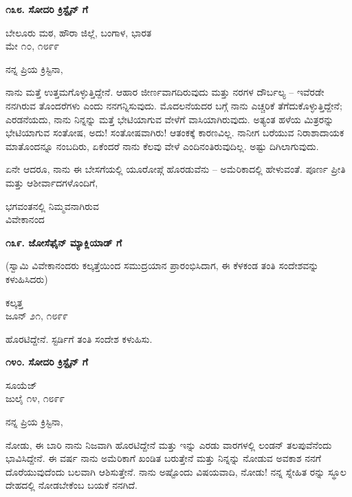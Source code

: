 \begin{center}
\textbf{೧೩೮. ಸೋದರಿ ಕ್ರಿಸ್ಟೈನ್ ಗೆ}
\end{center}

\begin{flushright}
ಬೇಲೂರು ಮಠ, ಹೌರಾ ಜಿಲ್ಲೆ, ಬಂಗಾಳ, ಭಾರತ\\ಮೇ ೧೦, ೧೮೯೯
\end{flushright}

ನನ್ನ ಪ್ರಿಯ ಕ್ರಿಸ್ಟಿನಾ,

ನಾನು ಮತ್ತೆ ಉತ್ತಮಗೊಳ್ಳುತ್ತಿದ್ದೇನೆ. ಆಹಾರ ಜೀರ್ಣವಾಗದಿರುವುದು ಮತ್ತು ನರಗಳ ದೌರ್ಬಲ್ಯ – ಇವೆರಡೇ ನನಗಿರುವ ತೊಂದರೆಗಳು ಎಂದು ನನಗನ್ನಿಸುವುದು. ಮೊದಲನೆಯದರ ಬಗ್ಗೆ ನಾನು ಎಚ್ಚರಿಕೆ ತೆಗೆದುಕೊಳ್ಳುತ್ತಿದ್ದೇನೆ; ಎರಡನೆಯದು, ನಾನು ನಿನ್ನನ್ನು ಮತ್ತೆ ಭೇಟಿಯಾಗುವ ವೇಳೆಗೆ ವಾಸಿಯಾಗಿರುವುದು. ಅತ್ಯಂತ ಹಳೆಯ ಮಿತ್ರರನ್ನು ಭೇಟಿಯಾಗುವ ಸಂತೋಷ, ಅದು! ಸಂತೋಷವಾಗಿರು! ಆತಂಕಕ್ಕೆ ಕಾರಣವಿಲ್ಲ. ನಾನೀಗ ಬರೆಯುವ ನಿರಾಶಾದಾಯಕ ಮಾತೊಂದನ್ನೂ ನಂಬದಿರು, ಏಕೆಂದರೆ ನಾನು ಕೆಲವು ವೇಳೆ ಎಂದಿನಂತಿರುವುದಿಲ್ಲ. ಅಷ್ಟು ದಿಗಿಲಾಗುವುದು.

ಏನೇ ಆದರೂ, ನಾನು ಈ ಬೇಸಗೆಯಲ್ಲಿ ಯೂರೋಪ್ಗೆ ಹೊರಡುವೆನು – ಅಮೆರಿಕಾದಲ್ಲಿ ಹೇಳುವಂತೆ. ಪೂರ್ಣ ಪ್ರೀತಿ ಮತ್ತು ಆಶೀರ್ವಾದಗಳೊಂದಿಗೆ,

\begin{flushright}
ಭಗವಂತನಲ್ಲಿ ನಿಮ್ಮವನಾಗಿರುವ\\ವಿವೇಕಾನಂದ
\end{flushright}

\begin{center}
\textbf{೧೩೯. ಜೋಸೆಫೈನ್ ಮ್ಯಾಕ್ಲಿಯಾಡ್ ಗೆ}
\end{center}

\begin{center}
(ಸ್ವಾಮಿ ವಿವೇಕಾನಂದರು ಕಲ್ಕತ್ತೆಯಿಂದ ಸಮುದ್ರಯಾನ ಪ್ರಾರಂಭಿಸಿದಾಗ, ಈ ಕೆಳಕಂಡ ತಂತಿ ಸಂದೇಶವನ್ನು ಕಳುಹಿಸಿದರು)
\end{center}

\begin{flushright}
ಕಲ್ಕತ್ತ\\ಜೂನ್ ೨೧, ೧೮೯೯
\end{flushright}

ಹೊರಟಿದ್ದೇನೆ. ಸ್ಟರ್ಡಿಗೆ ತಂತಿ ಸಂದೇಶ ಕಳುಹಿಸು.

\begin{center}
\textbf{೧೪೦. ಸೋದರಿ ಕ್ರಿಸ್ಟೈನ್ ಗೆ}
\end{center}

\begin{flushright}
ಸೂಯೆಜ್\\ಜುಲೈ ೧೪, ೧೮೯೯
\end{flushright}

ನನ್ನ ಪ್ರಿಯ ಕ್ರಿಸ್ಟಿನಾ,

ನೋಡು, ಈ ಬಾರಿ ನಾನು ನಿಜವಾಗಿ ಹೊರಟಿದ್ದೇನೆ ಮತ್ತು ಇನ್ನು ಎರಡು ವಾರಗಳಲ್ಲಿ ಲಂಡನ್ ತಲಪುವೆನೆಂದು ಭಾವಿಸಿದ್ದೇನೆ. ಈ ವರ್ಷ ನಾನು ಅಮೆರಿಕಾಗೆ ಖಂಡಿತ ಬರುತ್ತೇನೆ ಮತ್ತು ನಿನ್ನನ್ನು ನೋಡುವ ಅವಕಾಶ ನನಗೆ ದೊರೆಯುವುದೆಂದು ಬಲವಾಗಿ ಆಶಿಸುತ್ತೇನೆ. ನಾನು ಅಷ್ಟೊಂದು ವಿಷಯವಾದಿ, ನೋಡು! ನನ್ನ ಸ್ನೇಹಿತ ರನ್ನು ಸ್ಥೂಲ ದೇಹದಲ್ಲಿ ನೋಡಬೇಕೆಂಬ ಬಯಕೆ ನನಗಿದೆ.

